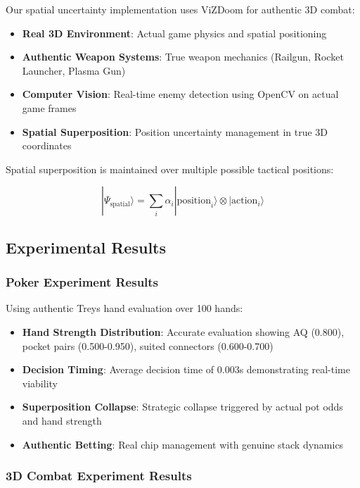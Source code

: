 \documentclass[11pt,a4paper]{article}
\begin{document}
Our spatial uncertainty implementation uses ViZDoom \citep{vizdoom2016} for authentic 3D combat:

\begin{itemize}
\item \textbf{Real 3D Environment}: Actual game physics and spatial positioning
\item \textbf{Authentic Weapon Systems}: True weapon mechanics (Railgun, Rocket Launcher, Plasma Gun)
\item \textbf{Computer Vision}: Real-time enemy detection using OpenCV on actual game frames
\item \textbf{Spatial Superposition}: Position uncertainty management in true 3D coordinates
\end{itemize}

Spatial superposition is maintained over multiple possible tactical positions:

\begin{equation}
|\Psi_{\text{spatial}}\rangle = \sum_{i} \alpha_i |\text{position}_i\rangle \otimes |\text{action}_i\rangle
\end{equation}

\subsection{Experimental Results}

\subsubsection{Poker Experiment Results}

Using authentic Treys hand evaluation over 100 hands:

\begin{itemize}
\item \textbf{Hand Strength Distribution}: Accurate evaluation showing AQ (0.800), pocket pairs (0.500-0.950), suited connectors (0.600-0.700)
\item \textbf{Decision Timing}: Average decision time of 0.003s demonstrating real-time viability
\item \textbf{Superposition Collapse}: Strategic collapse triggered by actual pot odds and hand strength
\item \textbf{Authentic Betting}: Real chip management with genuine stack dynamics
\end{itemize}

\subsubsection{3D Combat Experiment Results}
\end{document}
